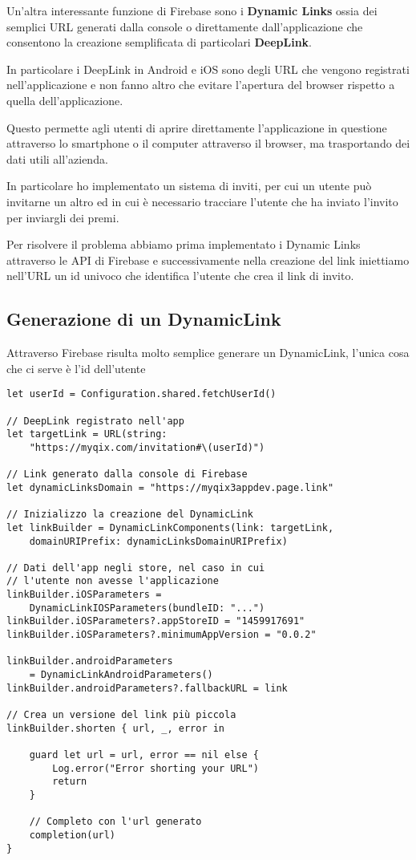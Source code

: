 
Un'altra interessante funzione di Firebase sono i \textbf{Dynamic Links}
ossia dei semplici URL generati dalla console o direttamente dall'applicazione
che consentono la creazione semplificata di particolari \textbf{DeepLink}.

In particolare i DeepLink in Android e iOS sono degli URL che vengono registrati nell'applicazione
e non fanno altro che evitare l'apertura del browser rispetto a quella dell'applicazione.

Questo permette agli utenti di aprire direttamente l'applicazione in questione
attraverso lo smartphone o il computer attraverso il browser, ma trasportando dei dati utili all'azienda.


In particolare ho implementato un sistema di inviti, per cui 
un utente può invitarne un altro ed in cui è necessario tracciare
l'utente che ha inviato l'invito per inviargli dei premi.

Per risolvere il problema abbiamo prima implementato i Dynamic Links attraverso le API
di Firebase e successivamente nella creazione del link iniettiamo nell'URL un id univoco che identifica l'utente
che crea il link di invito.

\subsection*{Generazione di un DynamicLink}

Attraverso Firebase risulta molto semplice generare un DynamicLink,
l'unica cosa che ci serve è l'id dell'utente

\begin{verbatim}
let userId = Configuration.shared.fetchUserId() 

// DeepLink registrato nell'app
let targetLink = URL(string:
    "https://myqix.com/invitation#\(userId)")

// Link generato dalla console di Firebase
let dynamicLinksDomain = "https://myqix3appdev.page.link"

// Inizializzo la creazione del DynamicLink
let linkBuilder = DynamicLinkComponents(link: targetLink,
    domainURIPrefix: dynamicLinksDomainURIPrefix)

// Dati dell'app negli store, nel caso in cui
// l'utente non avesse l'applicazione
linkBuilder.iOSParameters = 
    DynamicLinkIOSParameters(bundleID: "...")
linkBuilder.iOSParameters?.appStoreID = "1459917691"
linkBuilder.iOSParameters?.minimumAppVersion = "0.0.2"

linkBuilder.androidParameters
    = DynamicLinkAndroidParameters()
linkBuilder.androidParameters?.fallbackURL = link

// Crea un versione del link più piccola
linkBuilder.shorten { url, _, error in
    
    guard let url = url, error == nil else {
        Log.error("Error shorting your URL")
        return
    }
    
    // Completo con l'url generato
    completion(url)
}

\end{verbatim}

